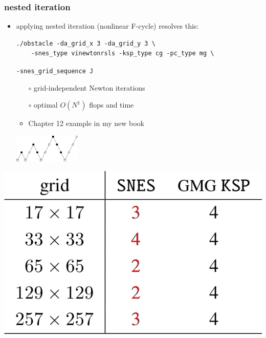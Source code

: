 \documentclass[svgnames,
               hyperref={colorlinks,citecolor=DeepPink4,linkcolor=FireBrick,urlcolor=Maroon},
               usepdftitle=false]  %
               {beamer}
\begin{document}
\begin{frame}[fragile]
\frametitle{nested iteration}

\begin{itemize}
\item applying nested iteration (nonlinear F-cycle) resolves this:

\vspace{2mm}
\begin{Verbatim}[xleftmargin=13mm,fontsize=\scriptsize]
./obstacle -da_grid_x 3 -da_grid_y 3 \
    -snes_type vinewtonrsls -ksp_type cg -pc_type mg \
\end{Verbatim}

\vspace{-1.5mm}
\hspace{18.7mm} {\scriptsize \color{FireBrick} \texttt{-snes\_grid\_sequence J}}

\vspace{2mm}
    \begin{itemize}
    \item[$\circ$] grid-independent Newton iterations
    \item[$\circ$] optimal $O(N^1)$ flops and time
    \item<2>[$\circ$] Chapter 12 example in my new book
    \end{itemize}

\vspace{-12mm}
\hfill \includegraphics[width=0.25\textwidth]{../talk-oxford/images/mg-fcycle.png}
\end{itemize}

\bigskip
\includegraphics[height=0.25\textheight]{../talk-oxford/images/vi-newton-gmg-good.png} 


\end{frame}
\end{document}
